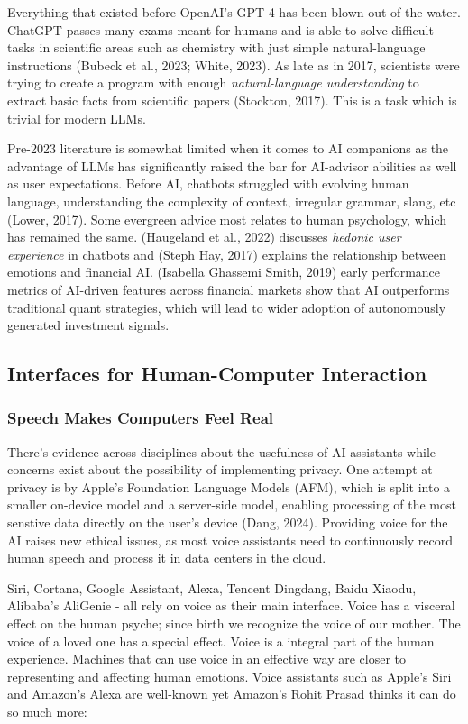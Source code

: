 \documentclass[
  letterpaper,
  DIV=11,
  numbers=noendperiod]{scrartcl}
\begin{document}
Everything that existed before OpenAI's GPT 4 has been blown out of the
water. ChatGPT passes many exams meant for humans and is able to solve
difficult tasks in scientific areas such as chemistry with just simple
natural-language instructions (Bubeck et al., 2023; White, 2023). As
late as in 2017, scientists were trying to create a program with enough
\emph{natural-language understanding} to extract basic facts from
scientific papers (Stockton, 2017). This is a task which is trivial for
modern LLMs.

Pre-2023 literature is somewhat limited when it comes to AI companions
as the advantage of LLMs has significantly raised the bar for AI-advisor
abilities as well as user expectations. Before AI, chatbots struggled
with evolving human language, understanding the complexity of context,
irregular grammar, slang, etc (Lower, 2017). Some evergreen advice most
relates to human psychology, which has remained the same. (Haugeland et
al., 2022) discusses \emph{hedonic user experience} in chatbots and
(Steph Hay, 2017) explains the relationship between emotions and
financial AI. (Isabella Ghassemi Smith, 2019) early performance metrics
of AI-driven features across financial markets show that AI outperforms
traditional quant strategies, which will lead to wider adoption of
autonomously generated investment signals.

\subsection{Interfaces for Human-Computer
Interaction}\label{interfaces-for-human-computer-interaction}

\subsubsection{Speech Makes Computers Feel
Real}\label{speech-makes-computers-feel-real}

There's evidence across disciplines about the usefulness of AI
assistants while concerns exist about the possibility of implementing
privacy. One attempt at privacy is by Apple's Foundation Language Models
(AFM), which is split into a smaller on-device model and a server-side
model, enabling processing of the most senstive data directly on the
user's device (Dang, 2024). Providing voice for the AI raises new
ethical issues, as most voice assistants need to continuously record
human speech and process it in data centers in the cloud.

Siri, Cortana, Google Assistant, Alexa, Tencent Dingdang, Baidu Xiaodu,
Alibaba's AliGenie - all rely on voice as their main interface. Voice
has a visceral effect on the human psyche; since birth we recognize the
voice of our mother. The voice of a loved one has a special effect.
Voice is a integral part of the human experience. Machines that can use
voice in an effective way are closer to representing and affecting human
emotions. Voice assistants such as Apple's Siri and Amazon's Alexa are
well-known yet Amazon's Rohit Prasad thinks it can do so much more:
\end{document}
